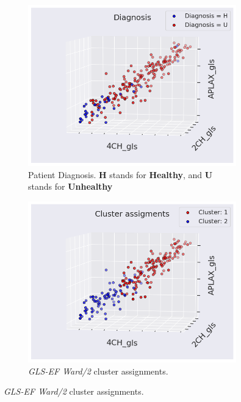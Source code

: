 \begin{figure}[H]
    \centering
    \begin{subfigure}[b]{0.49\textwidth}
        \centering
        \includegraphics[width=0.99\textwidth]{results/pd/scatter_gls_indication_bin.png}
        \caption{Patient Diagnosis. \textbf{H} stands for \textbf{Healthy}, and \textbf{U} stands for \textbf{Unhealthy}}
        \label{fig:scatter_gls_pd}
    \end{subfigure}
    \begin{subfigure}[b]{0.49\textwidth}
        \centering
        \includegraphics[width=0.99\textwidth]{results/pd/scatter_gls_EF_ward2.png}
        \caption{\textit{GLS-EF Ward/2} cluster assignments.}

\end{subfigure}
\end{figure}
